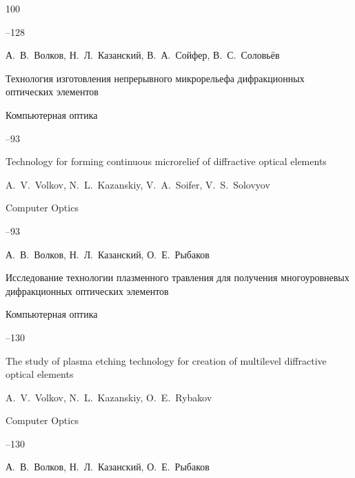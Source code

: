 \begin{thebibliography}{100}



--128








\by А.~В.~Волков, Н.~Л.~Казанский, В.~А.~Сойфер, В.~С.~Соловьёв

\paper Технология изготовления непрерывного микрорельефа дифракционных оптических элементов

\jour Компьютерная оптика



--93

\misctransl

\paper  Technology for forming continuous microrelief of diffractive optical elements 

\by A.~V.~Volkov, N.~L.~Kazanskiy, V.~A.~Soifer, V.~S.~Solovyov 

\jour Computer Optics



--93




\by А.~В.~Волков, Н.~Л.~Казанский, О.~Е.~Рыбаков

\paper Исследование технологии плазменного травления для получения многоуровневых дифракционных оптических элементов

\jour Компьютерная оптика



--130

\misctransl

\paper The study of plasma etching technology for creation of multilevel diffractive optical elements 

\by A.~V.~Volkov, N.~L.~Kazanskiy, O.~E.~Rybakov 

\jour Computer Optics



--130






\by А.~В.~Волков, Н.~Л.~Казанский, О.~Е.~Рыбаков


\end{thebibliography}
